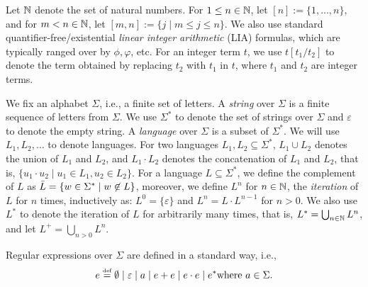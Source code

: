 

Let $\mathbb{N}$ denote the set of natural numbers. For $1\leq n\in \mathbb{N}$, let $[n]:=\{1, \ldots, n\}$, and for $m<n \in \mathbb{N}$, let $[m,n] := \{j \mid m \le j \le n\}$. We also use standard quantifier-free/existential \emph{linear integer arithmetic} (LIA) formulas, which are typically ranged over by $\phi, \varphi$, etc. For an integer term $t$, we use $t[t_1/t_2]$ to denote the term obtained by replacing $t_2$ with $t_1$ in $t$, where $t_1$ and $t_2$ are integer terms.

\smallskip
{} We fix an alphabet $\Sigma$, i.e., a finite set of letters. 
A \emph{string} over $\Sigma$ is a finite sequence of letters from $\Sigma$. We use $\Sigma^*$ to denote the set of strings over $\Sigma$ and $\varepsilon$ to denote the empty string. %
%
A \emph{language} over $\Sigma$ is a subset of $\Sigma^*$. We will use $L_1, L_2, \dots$ to denote languages. For two languages $L_1, L_2\subseteq \Sigma^*$, $L_1 \cup L_2$ denotes the union of $L_1$ and $L_2$, and $L_1 \cdot L_2$  denotes the concatenation of $L_1$ and $L_2$, that is,  $\{u_1 \cdot u_2 \mid u_1 \in L_1, u_2 \in L_2\}$. For a language $L\subseteq\Sigma^*$, we define the complement of $L$ as $\Bar{L} = \{w\in\Sigma^*\mid w\not\in L\}$, moreover, we define $L^n$ for $n \in \mathbb{N}$, the \emph{iteration} of $L$ for $n$ times, inductively as: $L^0=\{\varepsilon\}$ and $L^{n} =L \cdot L^{n-1}$ for $n > 0$. We also use $L^*$ to denote the iteration of $L$ for arbitrarily many times, that is, $L^* = \bigcup_{n \in \mathbb{N}} L^n$, and let $L^+ = \bigcup_{n>0} L^n$. 

Regular expressions over $\Sigma$ are defined in a standard way, i.e., 
$$e \eqdef \emptyset \mid \varepsilon \mid a \mid e + e \mid e \concat e \mid e^*  \text{where}\  a \in \Sigma.$$
%

